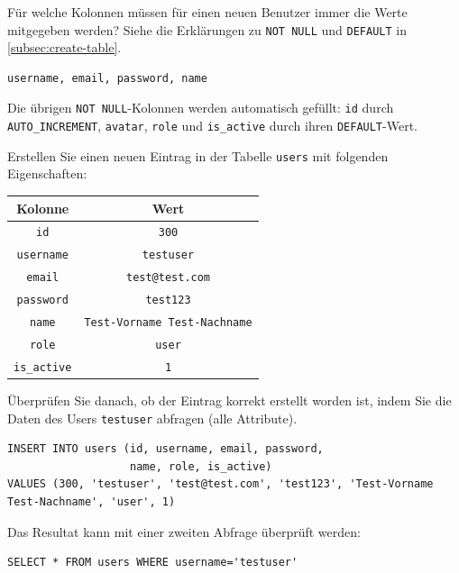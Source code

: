 \begin{myexercise}
\label{aufg:sql-insert}
  Für welche Kolonnen müssen für einen neuen Benutzer immer die Werte mitgegeben werden? Siehe die Erklärungen zu \lstinline|NOT NULL| und \lstinline|DEFAULT| in \cref{subsec:create-table}.
  \begin{myanswer}
    \begin{verbatim}
username, email, password, name
\end{verbatim}
    Die übrigen \lstinline|NOT NULL|-Kolonnen werden automatisch gefüllt: \texttt{id} durch \lstinline|AUTO_INCREMENT|, \texttt{avatar}, \texttt{role} und \texttt{is\_active} durch ihren \lstinline|DEFAULT|-Wert.
  \end{myanswer}
\end{myexercise}
\begin{myexercise}\label{aufg:a-sql-insert}
  Erstellen Sie einen neuen Eintrag in der Tabelle \texttt{users} mit folgenden Eigenschaften:
  \begin{table}[H]
    \centering
    \begin{tabular}{c|c}
      \textbf{Kolonne}    & \textbf{Wert}                       \\\midrule
      \texttt{id}         & \texttt{300}                        \\
      \texttt{username}   & \texttt{testuser}                   \\
      \texttt{email}      & \texttt{test@test.com}              \\
      \texttt{password}   & \texttt{test123}                    \\
      \texttt{name}       & \texttt{Test-Vorname Test-Nachname} \\
      \texttt{role}       & \texttt{user}                       \\
      \texttt{is\_active} & \texttt{1}                          \\
    \end{tabular}
  \end{table}
  Überprüfen Sie danach, ob der Eintrag korrekt erstellt worden ist, indem Sie die Daten des Users \texttt{testuser} abfragen (alle Attribute).
  \begin{myanswer}
    \begin{lstlisting}
INSERT INTO users (id, username, email, password,
				   name, role, is_active)
VALUES (300, 'testuser', 'test@test.com', 'test123', 'Test-Vorname Test-Nachname', 'user', 1)
\end{lstlisting}
Das Resultat kann mit einer zweiten Abfrage überprüft werden:
\begin{lstlisting}
SELECT * FROM users WHERE username='testuser'
\end{lstlisting}
  \end{myanswer}
\end{myexercise}

